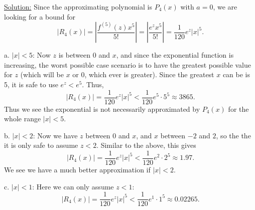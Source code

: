 \medskip
\underline{Solution:} Since the approximating polynomial
is $P_4(x)$ with $a=0$, we are looking for a bound for
$$|R_4(x)|=\left|\frac{f^{(5)}(z)x^5}{5!}\right|
=\left|\frac{e^zx^5}{5!}\right|=\frac1{120}e^z|x|^5.$$

a. $|x|<5$: Now $z$ is between $0$ and $x$, and since
the exponential function is increasing, the worst possible
case scenario is to have the greatest possible value for 
$z$ (which will be $x$ or $0$, which ever is greater).
Since the greatest $x$ can be is 5, it is safe to
use $e^z<e^5$.  Thus,
$$|R_4(x)|=\frac1{120}e^z|x|^5<\frac1{120}e^5\cdot5^5
\approx 3865.$$ 
Thus we see the exponential is not necessarily approximated 
by $P_4(x)$ for the whole range $|x|<5$.

b. $|x|<2$: Now we have $z$ between $0$ and $x$, and 
$x$ between $-2$ and $2$, so the the it is only safe to
assume $z<2$.  Similar to the  above, this gives
$$|R_4(x)|=\frac1{120}e^z|x|^5<\frac1{120}e^2\cdot2^5
\approx 1.97.$$
We see we have a much better approximation if $|x|<2$.

c. $|x|<1$: Here we can only assume $z<1$: 
$$|R_4(x)|=\frac1{120}e^z|x|^5<\frac1{120}e^1\cdot1^5
\approx 0.02265.$$ 

